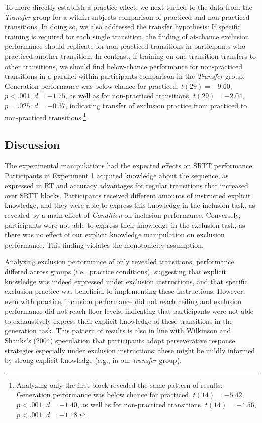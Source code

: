 \documentclass[man]{apa6}
\theoremstyle{definition}
\theoremstyle{definition}
\theoremstyle{definition}
\theoremstyle{remark}
\begin{document}
To more directly establish a practice effect, we next turned to the data
from the \emph{Transfer} group for a within-subjects comparison of
practiced and non-practiced transitions. In doing so, we also addressed
the transfer hypothesis: If specific training is required for each
single transition, the finding of at-chance exclusion performance should
replicate for non-practiced transitions in participants who practiced
another transition. In contrast, if training on one transition transfers
to other transitions, we should find below-chance performance for
non-practiced transitions in a parallel within-participants comparison
in the \emph{Transfer} group. Generation performance was below chance
for practiced, \(t(29) = -9.60\), \(p < .001\), \(d = -1.75\), as well
as for non-practiced transitions, \(t(29) = -2.04\), \(p = .025\),
\(d = -0.37\), indicating transfer of exclusion practice from practiced
to non-practiced transitions.\footnote{Analyzing only the first block
  revealed the same pattern of results: Generation performance was below
  chance for practiced, \(t(14) = -5.42\), \(p < .001\), \(d = -1.40\),
  as well as for non-practiced transitions, \(t(14) = -4.56\),
  \(p < .001\), \(d = -1.18\).}

\subsection{Discussion}\label{discussion}

The experimental manipulations had the expected effects on SRTT
performance: Participants in Experiment 1 acquired knowledge about the
sequence, as expressed in RT and accuracy advantages for regular
transitions that increased over SRTT blocks. Participants received
different amounts of instructed explicit knowledge, and they were able
to express this knowledge in the inclusion task, as revealed by a main
effect of \emph{Condition} on inclusion performance. Conversely,
participants were not able to express their knowledge in the exclusion
task, as there was no effect of our explicit knowledge manipulation on
exclusion performance. This finding violates the monotonicity
assumption.

Analyzing exclusion performance of only revealed transitions,
performance differed across groups (i.e., practice conditions),
suggesting that explicit knowledge was indeed expressed under exclusion
instructions, and that specific exclusion practice was beneficial to
implementing these instructions. However, even with practice, inclusion
performance did not reach ceiling and exclusion performance did not
reach floor levels, indicating that participants were not able to
exhaustively express their explicit knowledge of these transitions in
the generation task. This pattern of results is also in line with
Wilkinson and Shanks's (2004) speculation that participants adopt
perseverative response strategies especially under exclusion
instructions; these might be mildly informed by strong explicit
knowledge (e.g., in our \emph{transfer} group).
\end{document}
